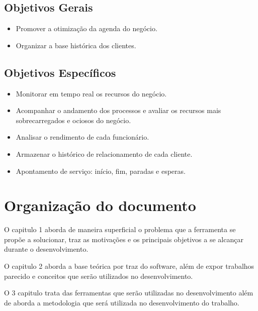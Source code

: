 \documentclass{automatextcc}
\begin{document}
\subsection{Objetivos Gerais}

\begin{itemize}
\item Promover a otimização da agenda do negócio.

\item Organizar a base histórica dos clientes. 

\end{itemize}

\subsection{Objetivos Específicos}

\begin{itemize}
\item Monitorar em tempo real os recursos do negócio.

\item Acompanhar o andamento dos processos e avaliar os recursos mais sobrecarregados e ociosos do negócio.

\item Analisar o rendimento de cada funcionário.

\item Armazenar o histórico de relacionamento de cada cliente.

\item Apontamento de serviço:  início, fim, paradas e esperas.

\end{itemize}

\section{Organização do documento}

O capitulo 1 aborda de maneira superficial o problema que a ferramenta se propõe a solucionar, traz as motivações e os principais objetivos a se alcançar durante o desenvolvimento.

O capitulo 2 aborda a base teórica por traz do software, além de expor trabalhos parecido e conceitos que serão utilizados no desenvolvimento.

O 3 capitulo trata das ferramentas que serão utilizadas no desenvolvimento além de aborda a metodologia que será utilizada no desenvolvimento do trabalho.
\end{document}

